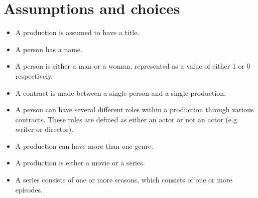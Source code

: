 \section{Assumptions and choices}
\begin{itemize}
	\item A production is assumed to have a title.
	\item A person has a name.
	\item A person is either a man or a woman, represented as a value of either 1 or 0 respectively.
	\item A contract is made between a single person and a single production.
	\item A person can have several different roles within a production through various contracts. These roles are defined as either an actor or not an actor (e.g. writer or director).
	\item A production can have more than one genre.
	\item A production is either a movie or a series.
	\item A series consists of one or more seasons, which consists of one or more episodes.
\end{itemize}
